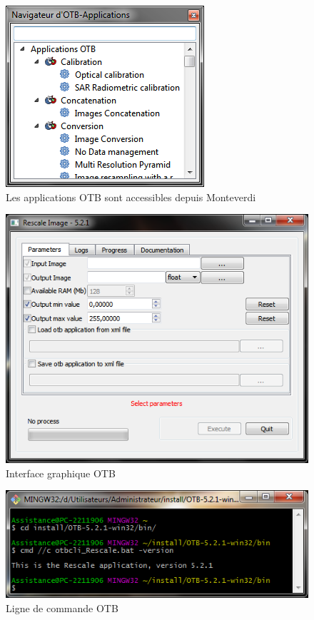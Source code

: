 \documentclass[10pt,a4paper]{article}
\begin{document}
\begin{figure}[h]
  \center
  \includegraphics[scale=1]{Art/windows-mapla.png}
  \caption[]{Les applications OTB sont accessibles depuis Monteverdi}
  \label{fig:windows-mapla}
\end{figure}

\begin{figure}[h]
  \center
  \includegraphics[scale=1]{Art/windows-otbgui.png}
  \caption[]{Interface graphique OTB}
  \label{fig:windows-otbgui}
\end{figure}

\begin{figure}[h]
  \center
  \includegraphics[scale=1]{Art/windows-otbcli.png}
  \caption[]{Ligne de commande OTB}
  \label{fig:windows-otbcli}
\end{figure}
\end{document}
